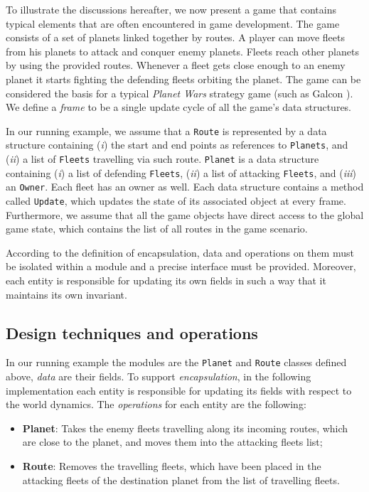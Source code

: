 
To illustrate the discussions hereafter, we now present a game that contains typical elements that are often encountered in game development. The game consists of a set of planets linked together by routes. A player can move fleets from his planets to attack and conquer enemy planets. Fleets reach other planets by using the provided routes. Whenever a fleet gets close enough to an enemy planet it starts fighting the defending fleets orbiting the planet. The game can be considered the basis for a typical \emph{Planet Wars} strategy game (such as Galcon \cite{wiki:galcon}). We define a \textit{frame} to be a single update cycle of all the game's data structures.

In our running example, we assume that a \texttt{Route} is represented by a data structure containing (\textit{i}) the start and end points as references to \texttt{Planets}, and (\textit{ii}) a list of \texttt{Fleets} travelling via such route. \texttt{Planet} is a data structure containing (\textit{i}) a list of defending \texttt{Fleets}, (\textit{ii}) a list of attacking \texttt{Fleets}, and (\textit{iii}) an \texttt{Owner}. Each fleet has an owner as well. Each data structure contains a method called \texttt{Update}, which updates the state of its associated object at every frame. Furthermore, we assume that all the game objects have direct access to the global game state, which contains the list of all routes in the game scenario.



According to the definition of encapsulation, data and operations on them must be isolated within a module and a precise interface must be provided. Moreover, each entity is responsible for updating its own fields in such a way that it maintains its own invariant.

\subsection{Design techniques and operations}

In our running example the modules are the \texttt{Planet} and \texttt{Route} classes defined above, \textit{data} are their fields. To support \emph{encapsulation}, in the following implementation each entity is responsible for updating its fields with respect to the world dynamics. The \textit{operations} for each entity are the following:
\begin{itemize}
    \item[] \textbf{Planet}: Takes the enemy fleets travelling along its incoming routes, which are close to the planet, and moves them into the attacking fleets list;
    \item[] \textbf{Route}: Removes the travelling fleets, which have been placed in the attacking fleets of the destination planet from the list of travelling fleets.
\end{itemize}

